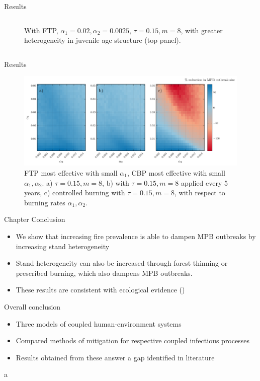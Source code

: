 \documentclass{beamer}
\begin{document}
\begin{frame}{Results}
\begin{columns}
\begin{column}[]{0.5\textwidth}
\begin{figure}
                \caption{\small With FTP, $\alpha_1 = 0.02, \alpha_2 = 0.0025$, $\tau = 0.15, m = 8$, with greater heterogeneity in juvenile age structure (top panel).}
            \end{figure}
        \end{column}
    \end{columns}
\end{frame}


\begin{frame}{Results}
    \begin{figure}
        \includegraphics[width=\textwidth]{mpb/a1_a2_trim_gain.pdf}
        \caption{FTP most effective with small $\alpha_1$, CBP most effective with small $\alpha_1, \alpha_2$.  a) $\tau = 0.15, m = 8$, b) with $\tau = 0.15, m = 8$ applied every 5 years, c) controlled burning with $\tau = 0.15, m = 8$,  with respect to burning rates $\alpha_1,\alpha_2$.}
    \end{figure}
\end{frame} 

\begin{frame}{Chapter Conclusion}
    \begin{itemize}
        \item We show that increasing fire prevalence is able to dampen MPB outbreaks by increasing stand heterogeneity 
        \item Stand heterogeneity can also be increased through forest thinning or prescribed burning, which also dampens MPB outbreaks.
        \item These results are consistent with ecological evidence (\citet{seidl2016spatial,kaufmann2008status})
    \end{itemize}
\end{frame}


\begin{frame}{Overall conclusion}
\begin{itemize}
    \item Three models of coupled human-environment systems
    \item Compared methods of mitigation for respective coupled infectious processes
    \item Results obtained from these answer a gap identified in literature
\end{itemize} a
\end{frame}
\end{document}
